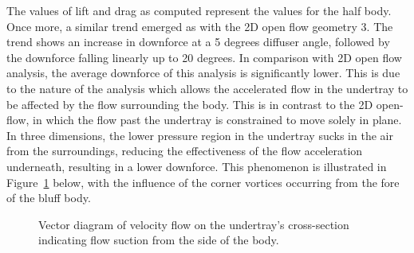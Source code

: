 \noindent The values of lift and drag as computed represent the values for the half body. Once more, a similar trend emerged as with the 2D open flow geometry 3. The trend shows an increase in downforce at a 5 degrees diffuser angle, followed by the downforce falling linearly up to 20 degrees. In comparison with 2D open flow analysis, the average downforce of this analysis is significantly lower. This is due to the nature of the analysis which allows the accelerated flow in the undertray to be affected by the flow surrounding the body. This is in contrast to the 2D open-flow, in which the flow past the undertray is constrained to move solely in plane. In three dimensions, the lower pressure region in the undertray sucks in the air from the surroundings, reducing the effectiveness of the flow acceleration underneath, resulting in a lower downforce. This phenomenon is illustrated in Figure~\ref{fig:Vector_suction_diagram} below, with the influence of the corner vortices occurring from the fore of the bluff body. 

\begin{figure}[!htb]
    \centering
    \noindent{}
    \caption{Vector diagram of velocity flow on the undertray's cross-section indicating flow suction from the side of the body.}
    \label{fig:Vector_suction_diagram}
\end{figure}

